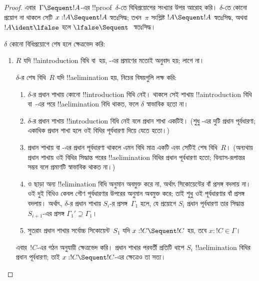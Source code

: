 \documentclass[../../../include/open-logic-section]{subfiles}
\begin{document}
\begin{proof}
এবার~$\Gamma \Sequent !A$-এর
!!{proof}~$\delta$-তে বিধিপ্রয়োগের
সংখ্যার উপর আরোহ করি।
$\delta$-তে কোনো প্রয়োগ না থাকলে
সেটি $x:!A \Sequent !A$ স্বতঃসিদ্ধ;
তখন~$\pi$ সংশ্লিষ্ট
$!A \Sequent !A$ স্বতঃসিদ্ধ,
অথবা $!A \ident \lfalse$ হলে
$\lfalse \Sequent \ $ স্বতঃসিদ্ধ।

$\delta$ কোনো বিধিপ্রয়োগে শেষ হলে
ক্ষেত্রভেদ করি:
\begin{enumerate}
  \item $R$ যদি !!a{introduction}
  বিধি বা~\FalseInt হয়,
  -এর
  প্রমাণের মতোই অনুবাদ হয়;
  \Cut{} লাগে না।

  $\delta$-র শেষ বিধি~$R$
  যদি !!a{elimination} হয়,
  নিচের বিষয়গুলি লক্ষ করি:
  \begin{enumerate}
    \item $\delta$-র প্রধান শাখায়
    কোনো !!{introduction} বিধি নেই।
    থাকলে সেই শাখায়
    !!a{introduction} বিধি বা~\FalseInt{}-এর
    পরে !!a{elimination} বিধি থাকত,
    ফলে $\delta$ স্বাভাবিক হতো না।
    \item $\delta$-র প্রধান শাখায়
    !!{introduction} বিধি নেই বলে
    প্রধান শাখা একটিই।
    (শুধু \Intro{\land}-এর দুটি
    প্রধান পূর্বধারণা; একাধিক প্রধান
    শাখা হলে ওই বিধির পূর্বধারণা
    দিয়ে যেতে হতো।)
    \item প্রধান শাখায়
    \Elim{\lor} বা \Elim{\lexists}-এর
    প্রধান পূর্বধারণা থাকলে
    এমন বিধি মাত্র একটি এবং
    সেটিই শেষ বিধি~$R$।
    (অন্যথায় প্রধান শাখায়
    ওই বিধির সিদ্ধান্ত পরের
    !!a{elimination} বিধির
    প্রধান পূর্বধারণা হতো;
    বিন্যাস-রূপান্তর সম্ভব বলে
    প্রমাণটি স্বাভাবিক থাকত না।)
  \item \Elim{\lor} ও
  \Elim{\lexists} ছাড়া অন্য
  !!{elimination} বিধি অনুমান
  অবমুক্ত করে না, অর্থাৎ
  সিকোয়েন্টের বাঁ প্রসঙ্গ বদলায় না।
  ওই দুই বিধিও কেবল গৌণ
  পূর্বধারণার উপরের অনুমান
  অবমুক্ত করে; তাই শুধু ওই
  পূর্বধারণার বাঁ প্রসঙ্গ বদলায়।
  অর্থাৎ, $\delta$-র প্রধান শাখায়
  $S_i$-র প্রসঙ্গ~$\Gamma_1$ হলে,
  যে প্রয়োগে $S_i$ প্রধান পূর্বধারণা
  তার সিদ্ধান্ত~$S_{i+1}$-এর প্রসঙ্গ
  $\Gamma_1' \supseteq \Gamma_1$।
  \item সুতরাং প্রধান শাখার
  সর্বোচ্চ সিকোয়েন্ট~$S_1$
  যদি $x: !C \Sequent !C$ হয়,
  তবে $x:!C \in \Gamma$।
  \end{enumerate}
  এবার~$!C$-এর গঠন অনুযায়ী
  ক্ষেত্রভেদ করি। প্রধান শাখার
  পরবর্তী প্রতিটি ধাপে $S_i$
  !!a{elimination} বিধির প্রধান
  পূর্বধারণা; তাই $x:!C \Sequent !C$-এর
  ক্ষেত্রেও তা সত্য।


\end{enumerate}
\end{proof}
\end{document}
